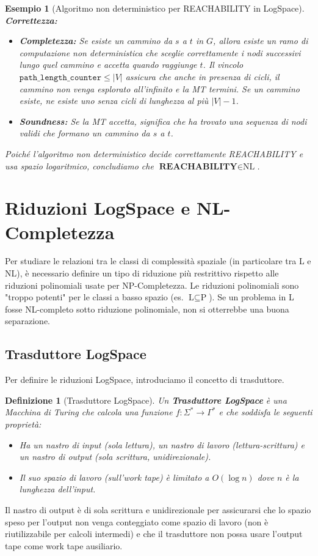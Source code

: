 \documentclass[a4paper, 11pt]{book} %
\newtheorem{definition}[theorem]{Definizione}
\newtheorem{example}[theorem]{Esempio}
\theoremstyle{definition}
\begin{document}
\begin{example}[Algoritmo non deterministico per REACHABILITY in LogSpace]
\textbf{Correttezza:}
\begin{itemize}
    \item \textbf{Completezza:} Se esiste un cammino da $s$ a $t$ in $G$, allora esiste un ramo di computazione non deterministica che sceglie correttamente i nodi successivi lungo quel cammino e accetta quando raggiunge $t$. Il vincolo $\texttt{path\_length\_counter} \leq |V|$ assicura che anche in presenza di cicli, il cammino non venga esplorato all'infinito e la MT termini. Se un cammino esiste, ne esiste uno senza cicli di lunghezza al più $|V|-1$.
    \item \textbf{Soundness:} Se la MT accetta, significa che ha trovato una sequenza di nodi validi che formano un cammino da $s$ a $t$.
\end{itemize}
Poiché l'algoritmo non deterministico decide correttamente REACHABILITY e usa spazio logaritmico, concludiamo che $\textbf{REACHABILITY} \in \text{NL}$.
\end{example}

\section{Riduzioni LogSpace e NL-Completezza}

Per studiare le relazioni tra le classi di complessità spaziale (in particolare tra L e NL), è necessario definire un tipo di riduzione più restrittivo rispetto alle riduzioni polinomiali usate per NP-Completezza. Le riduzioni polinomiali sono "troppo potenti" per le classi a basso spazio (es. $\text{L} \subseteq \text{P}$). Se un problema in L fosse NL-completo sotto riduzione polinomiale, non si otterrebbe una buona separazione.

\subsection{Trasduttore LogSpace}

Per definire le riduzioni LogSpace, introduciamo il concetto di trasduttore.

\begin{definition}[Trasduttore LogSpace]
Un \textbf{Trasduttore LogSpace} è una Macchina di Turing che calcola una funzione $f: \Sigma^* \to \Gamma^*$ e che soddisfa le seguenti proprietà:
\begin{itemize}
    \item Ha un nastro di input (sola lettura), un nastro di lavoro (lettura-scrittura) e un nastro di output (sola scrittura, unidirezionale).
    \item Il suo spazio di lavoro (sull'work tape) è limitato a $O(\log n)$ dove $n$ è la lunghezza dell'input.
\end{itemize}
\end{definition}
Il nastro di output è di sola scrittura e unidirezionale per assicurarsi che lo spazio speso per l'output non venga conteggiato come spazio di lavoro (non è riutilizzabile per calcoli intermedi) e che il trasduttore non possa usare l'output tape come work tape ausiliario.
\end{document}
